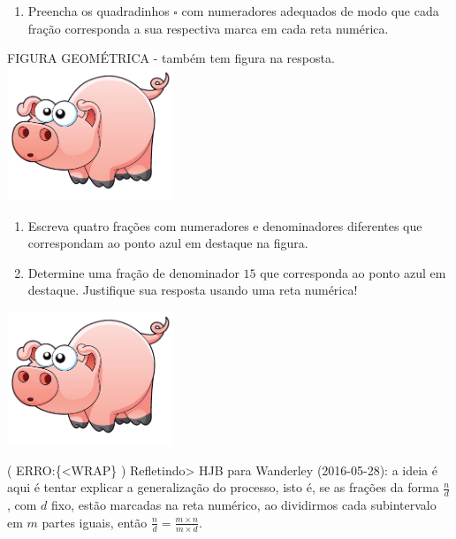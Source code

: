 \documentclass[a4,12pt]{book}
\begin{document}
\begin{enumerate} [\quad a)] %
  \item     Preencha os quadradinhos     $\square$     com numeradores adequados de modo que cada fração corresponda a sua respectiva marca em cada reta numérica.
\end{enumerate} %
\mbox{} \newline  \begin{imagem*}[breakable]{}{}   FIGURA GEOMÉTRICA - também tem figura na resposta.  \mbox{} \newline        \includegraphics[width=\textwidth,height=4cm, keepaspectratio]{pig}   \end{imagem*}
\begin{enumerate} [\quad a)] %
  \item     Escreva quatro frações com numeradores e denominadores diferentes que correspondam ao ponto azul em destaque na figura.
  \item     Determine uma fração de denominador     $15$     que corresponda ao ponto azul em destaque. Justifique sua resposta usando uma reta numérica!
\end{enumerate} %






\includegraphics[width=\textwidth,height=4cm, keepaspectratio]{pig}


( ERRO:\{<WRAP\} ) Refletindo>
HJB para Wanderley (2016-05-28): a ideia é aqui é tentar explicar a generalização do processo, isto é, se as frações da forma $\frac{n}{d}$, com $d$ fixo, estão marcadas na reta numérico, ao dividirmos cada subintervalo em $m$ partes iguais, então $\frac{n}{d} = \frac{m \times n}{m \times d}$.
\end{document}
